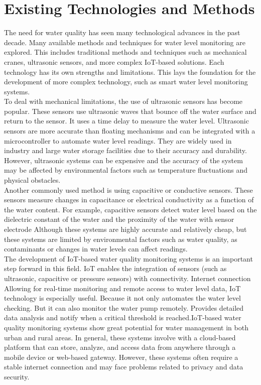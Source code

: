 \section{Existing Technologies and Methods}
{\fontsize{12}{14}\selectfont 
    The need for water quality has seen many technological advances in the past
decade. Many available methods and techniques for water level monitoring are
explored. This includes traditional methods and techniques such as mechanical
cranes, ultrasonic sensors, and more complex IoT-based solutions. Each
technology has its own strengths and limitations. This lays the foundation for the
development of more complex technology, such as smart water level monitoring
systems.\\

\noindent
To deal with mechanical limitations, the use of ultrasonic sensors has become
popular. These sensors use ultrasonic waves that bounce off the water surface and
return to the sensor. It uses a time delay to measure the water level. Ultrasonic
sensors are more accurate than floating mechanisms and can be integrated with a
microcontroller to automate water level readings. They are widely used in industry
and large water storage facilities due to their accuracy and durability. However,
ultrasonic systems can be expensive and the accuracy of the system may be
affected by environmental factors such as temperature fluctuations and physical
obstacles.\\

\noindent
Another commonly used method is using capacitive or conductive sensors. These
sensors measure changes in capacitance or electrical conductivity as a function of
the water content. For example, capacitive sensors detect water level based on the
dielectric constant of the water and the proximity of the water with sensor electrode
Although these systems are highly accurate and relatively cheap, but these
systems are limited by environmental factors such as water quality, as
contaminants or changes in water levels can affect readings.\\


\noindent
The development of IoT-based water quality monitoring systems is an important step forward in this field. IoT enables the integration of sensors (such as ultrasonic, capacitive or pressure sensors) with connectivity. Internet connection Allowing for real-time monitoring and remote access to water level data, IoT technology is especially useful. Because it not only automates the water level checking. But it can also monitor the water pump remotely. Provides detailed data analysis and notify when a critical threshold is reached.IoT-based water quality monitoring systems show great potential for water management in both urban and rural areas. In general, these systems involve with a cloud-based platform that can store, analyze, and access data from anywhere through a mobile device or web-based gateway. However, these systems often require a stable internet connection and may face problems related to privacy and data security.
\\


}
